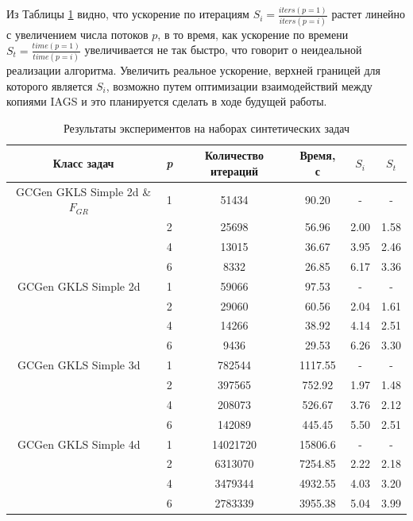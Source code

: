 Из Таблицы \ref{tab:speedup} видно, что ускорение по итерациям \(S_i=\frac{iters(p=1)}{iters(p=i)}\) растет линейно с увеличением числа потоков \(p\),
в то время, как ускорение по времени \(S_t=\frac{time(p=1)}{time(p=i)}\) увеличивается не так быстро, что говорит о неидеальной
реализации алгоритма. Увеличить реальное ускорение, верхней границей для которого является
\(S_i\), возможно путем оптимизации взаимодействий между копиями IAGS и это планируется сделать в ходе будущей работы.

\begin{table}
  \centering
  \caption{Результаты экспериментов на наборах синтетических задач}
  \label{tab:speedup}
  \begin{tabular}{c|c|cccc}
    Класс задач & \textit{p} & Количество итераций & Время, с & \(S_i\) & \(S_t\)   \\
    \hline
    GCGen GKLS Simple 2d \& \(F_{GR}\) \
      & 1 & 51434 & 90.20 & -    & - \\
      & 2 & 25698 & 56.96 & 2.00 & 1.58 \\
      & 4 & 13015 & 36.67 & 3.95 & 2.46 \\
      & 6 & 8332  & 26.85 & 6.17 & 3.36 \\
    \hline
    GCGen GKLS Simple 2d \
      & 1 & 59066 & 97.53 & -    & - \\
      & 2 & 29060 & 60.56 & 2.04 & 1.61 \\
      & 4 & 14266 & 38.92 & 4.14 & 2.51 \\
      & 6 & 9436  & 29.53 & 6.26 & 3.30 \\
    \hline
    GCGen GKLS Simple 3d \
      & 1 & 782544 & 1117.55 & -    & - \\
      & 2 & 397565 & 752.92  & 1.97 & 1.48 \\
      & 4 & 208073 & 526.67  & 3.76 & 2.12 \\
      & 6 & 142089 & 445.45  & 5.50 & 2.51 \\
    \hline
    GCGen GKLS Simple 4d \
      & 1 & 14021720 & 15806.6 & -    & - \\
      & 2 & 6313070 & 7254.85  & 2.22 & 2.18 \\
      & 4 & 3479344 & 4932.55  & 4.03 & 3.20 \\
      & 6 & 2783339 & 3955.38  & 5.04 & 3.99 \\
    \hline
  \end{tabular}
\end{table}

